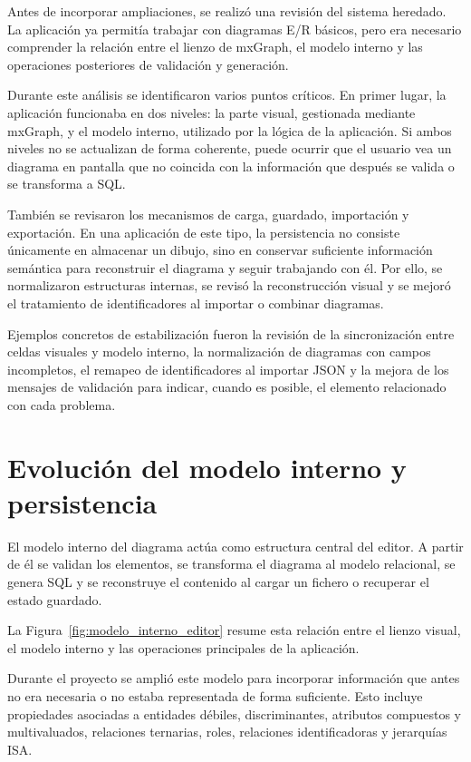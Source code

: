 Antes de incorporar ampliaciones, se realizó una revisión del sistema heredado. La aplicación ya permitía trabajar con diagramas E/R básicos, pero era necesario comprender la relación entre el lienzo de mxGraph, el modelo interno y las operaciones posteriores de validación y generación.

Durante este análisis se identificaron varios puntos críticos. En primer lugar, la aplicación funcionaba en dos niveles: la parte visual, gestionada mediante mxGraph, y el modelo interno, utilizado por la lógica de la aplicación. Si ambos niveles no se actualizan de forma coherente, puede ocurrir que el usuario vea un diagrama en pantalla que no coincida con la información que después se valida o se transforma a SQL.

También se revisaron los mecanismos de carga, guardado, importación y exportación. En una aplicación de este tipo, la persistencia no consiste únicamente en almacenar un dibujo, sino en conservar suficiente información semántica para reconstruir el diagrama y seguir trabajando con él. Por ello, se normalizaron estructuras internas, se revisó la reconstrucción visual y se mejoró el tratamiento de identificadores al importar o combinar diagramas.

Ejemplos concretos de estabilización fueron la revisión de la sincronización entre celdas visuales y modelo interno, la normalización de diagramas con campos incompletos, el remapeo de identificadores al importar JSON y la mejora de los mensajes de validación para indicar, cuando es posible, el elemento relacionado con cada problema.

\section{Evolución del modelo interno y persistencia}

El modelo interno del diagrama actúa como estructura central del editor. A partir de él se validan los elementos, se transforma el diagrama al modelo relacional, se genera SQL y se reconstruye el contenido al cargar un fichero o recuperar el estado guardado.

La Figura~\ref{fig:modelo_interno_editor} resume esta relación entre el lienzo visual, el modelo interno y las operaciones principales de la aplicación.


Durante el proyecto se amplió este modelo para incorporar información que antes no era necesaria o no estaba representada de forma suficiente. Esto incluye propiedades asociadas a entidades débiles, discriminantes, atributos compuestos y multivaluados, relaciones ternarias, roles, relaciones identificadoras y jerarquías ISA.

